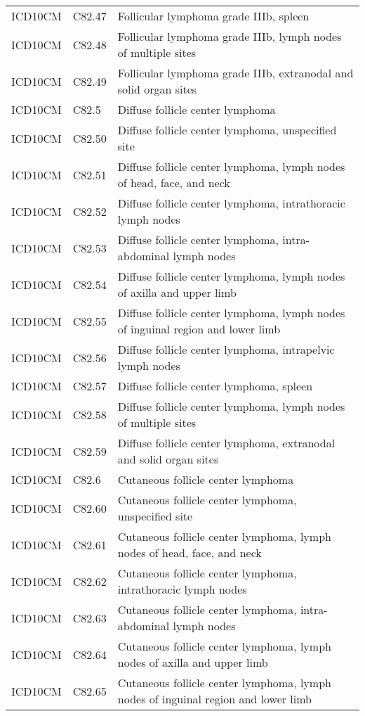 \begin{longtable}{p{}p{}p{}}
  ICD10CM & C82.47 & Follicular lymphoma grade IIIb, spleen \\ 
  ICD10CM & C82.48 & Follicular lymphoma grade IIIb, lymph nodes of multiple sites \\ 
  ICD10CM & C82.49 & Follicular lymphoma grade IIIb, extranodal and solid organ sites \\ 
  ICD10CM & C82.5 & Diffuse follicle center lymphoma \\ 
  ICD10CM & C82.50 & Diffuse follicle center lymphoma, unspecified site \\ 
  ICD10CM & C82.51 & Diffuse follicle center lymphoma, lymph nodes of head, face, and neck \\ 
  ICD10CM & C82.52 & Diffuse follicle center lymphoma, intrathoracic lymph nodes \\ 
  ICD10CM & C82.53 & Diffuse follicle center lymphoma, intra-abdominal lymph nodes \\ 
  ICD10CM & C82.54 & Diffuse follicle center lymphoma, lymph nodes of axilla and upper limb \\ 
  ICD10CM & C82.55 & Diffuse follicle center lymphoma, lymph nodes of inguinal region and lower limb \\ 
  ICD10CM & C82.56 & Diffuse follicle center lymphoma, intrapelvic lymph nodes \\ 
  ICD10CM & C82.57 & Diffuse follicle center lymphoma, spleen \\ 
  ICD10CM & C82.58 & Diffuse follicle center lymphoma, lymph nodes of multiple sites \\ 
  ICD10CM & C82.59 & Diffuse follicle center lymphoma, extranodal and solid organ sites \\ 
  ICD10CM & C82.6 & Cutaneous follicle center lymphoma \\ 
  ICD10CM & C82.60 & Cutaneous follicle center lymphoma, unspecified site \\ 
  ICD10CM & C82.61 & Cutaneous follicle center lymphoma, lymph nodes of head, face, and neck \\ 
  ICD10CM & C82.62 & Cutaneous follicle center lymphoma, intrathoracic lymph nodes \\ 
  ICD10CM & C82.63 & Cutaneous follicle center lymphoma, intra-abdominal lymph nodes \\ 
  ICD10CM & C82.64 & Cutaneous follicle center lymphoma, lymph nodes of axilla and upper limb \\ 
  ICD10CM & C82.65 & Cutaneous follicle center lymphoma, lymph nodes of inguinal region and lower limb \\ 

\end{longtable}
